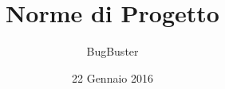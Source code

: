 



\title{\textbf{Norme di Progetto}}
\author{BugBuster}

\date{22 Gennaio 2016}




\makeFrontPage

\tableofcontents





